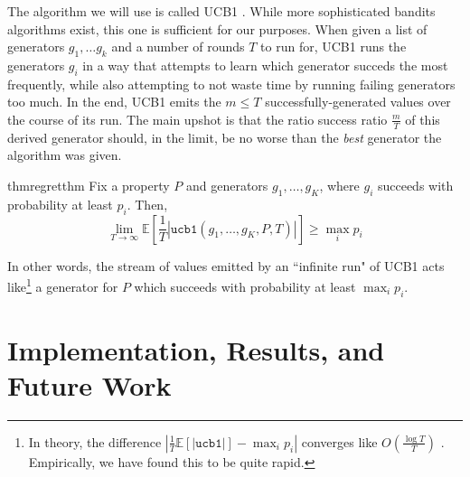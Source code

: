 \documentclass[sigconf,nonacm,review,anonymous]{acmart}
\begin{document}
The algorithm we will use is called UCB1 \cite{auer2002finite}. While more sophisticated
bandits algorithms exist, this one is sufficient for our purposes. When given a list of generators
$g_1,\dots g_k$ and a number of rounds $T$ to run for, UCB1 runs the generators $g_i$ in a way that attempts
to learn which generator succeds the most frequently, while also attempting to not waste time by running
failing generators too much. In the end, UCB1 emits the $m \leq T$ successfully-generated values over the course of its run.
The main upshot is that the ratio success ratio $\frac{m}{T}$ of this derived generator should, in the limit,
be no worse than the \emph{best} generator the algorithm was given. 
\begin{restatable}{thm}{regretthm}
Fix a property $P$ and generators $g_1,\dots,g_K$, where $g_i$ succeeds with probability at least $p_i$. Then,
\vspace{-2px}
\[
\lim_{T \to \infty} \mathbb{E}\left[\frac{1}{T}\left|\texttt{ucb1}(g_1,\dots,g_K,P,T)\right|\right] \geq \max_i p_i
\]
\end{restatable}
In other words, the stream of values
emitted by an ``infinite run" of UCB1 acts like\footnote{In theory, the difference $\left|\frac{1}{T}\mathbb{E}\left[\left|\texttt{ucb1}\right|\right] - \max_i p_i \right|$ converges like $O\left(\frac{\log T}{T}\right)$ \cite[Theorem 1]{auer2002finite}. Empirically, we have found this to be quite rapid.} a
generator for $P$ which succeeds with probability at least $\max_i p_i$.


\section{Implementation, Results, and Future Work}
\label{sec:impl}
\end{document}
